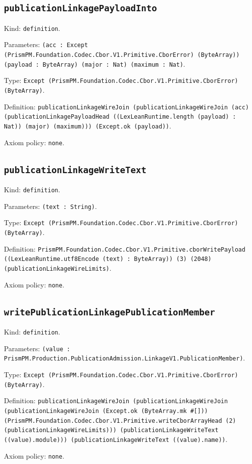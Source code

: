 \documentclass[11pt]{article}
\begin{document}
\subsection*{\texttt{publicationLinkagePayloadInto}}
\noindent Kind: \texttt{definition}.\par
\noindent Parameters: \texttt{(acc : Except (PrismPM.Foundation.Codec.Cbor.V1.Primitive.CborError) (ByteArray)) (payload : ByteArray) (major : Nat) (maximum : Nat)}.\par
\noindent Type: \texttt{Except (PrismPM.Foundation.Codec.Cbor.V1.Primitive.CborError) (ByteArray)}.\par
\noindent Definition: \texttt{publicationLinkageWireJoin (publicationLinkageWireJoin (acc) (publicationLinkagePayloadHead ((LexLeanRuntime.length (payload) : Nat)) (major) (maximum))) (Except.ok (payload))}.\par
\noindent Axiom policy: \texttt{none}.\par
\subsection*{\texttt{publicationLinkageWriteText}}
\noindent Kind: \texttt{definition}.\par
\noindent Parameters: \texttt{(text : String)}.\par
\noindent Type: \texttt{Except (PrismPM.Foundation.Codec.Cbor.V1.Primitive.CborError) (ByteArray)}.\par
\noindent Definition: \texttt{PrismPM.Foundation.Codec.Cbor.V1.Primitive.cborWritePayload ((LexLeanRuntime.utf8Encode (text) : ByteArray)) (3) (2048) (publicationLinkageWireLimits)}.\par
\noindent Axiom policy: \texttt{none}.\par
\subsection*{\texttt{writePublicationLinkagePublicationMember}}
\noindent Kind: \texttt{definition}.\par
\noindent Parameters: \texttt{(value : PrismPM.Production.PublicationAdmission.LinkageV1.PublicationMember)}.\par
\noindent Type: \texttt{Except (PrismPM.Foundation.Codec.Cbor.V1.Primitive.CborError) (ByteArray)}.\par
\noindent Definition: \texttt{publicationLinkageWireJoin (publicationLinkageWireJoin (publicationLinkageWireJoin (Except.ok (ByteArray.mk \#[])) (PrismPM.Foundation.Codec.Cbor.V1.Primitive.writeCborArrayHead (2) (publicationLinkageWireLimits))) (publicationLinkageWriteText ((value).module))) (publicationLinkageWriteText ((value).name))}.\par
\noindent Axiom policy: \texttt{none}.\par
\end{document}
